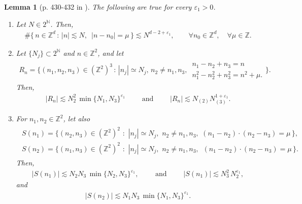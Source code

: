 \documentclass[11pt, xcolor = dvipsnames,reqno
]{amsart}
\newtheorem{lem}[thm]{Lemma}
\theoremstyle{definition}
\theoremstyle{remark}
\begin{document}
\begin{lem}[p. 430-432 in \cite{Bourgain1996}]
\label{lemma:combest-nopairings-cubic}
The following are true for every $\varepsilon_1 > 0$. 
\begin{enumerate}
    \item Let $N \in 2^{\mathbb N}$. Then,
    \begin{align}
        \# \big\{ \, n \in \mathbb Z^d \, : \, |n| \lesssim N, \,\, \,  |n - n_0| = \mu \, \big\} \lesssim N^{d-2+\varepsilon_1}, 
        \qquad \forall n_0 \in \mathbb Z^d, \quad \forall \mu \in \mathbb Z. 
    \end{align}

    \item Let $\{N_j\} \subset 2^{\mathbb{N}}$ and $n \in \mathbb{Z}^2$, and let 
    \begin{align*}
        R_n = \bigg\{ (n_1,n_2,n_3) \in (\mathbb{Z}^2)^3 \, : \,  |n_j| \simeq N_j, \, n_2 \neq n_1 , n_3, \, 
        \begin{array}{ll}
            n_1 - n_2 + n_3 = n \\
            n_1^2 - n_2^2 + n_3^2 = n^2 + \mu.
        \end{array}
        \bigg\}.
    \end{align*}
    Then, 
    \begin{align*}
        |R_n| \lesssim  N_2^2 \, \min\{N_1,N_3\}^{\varepsilon_1}
        \qquad \text{ and } \qquad  
        |R_n| \lesssim  N_{(2)}N_{(3)}^{1 + \varepsilon_1}.
    \end{align*}

    \item For $n_1, n_2 \in \mathbb Z^2$, let also
    \begin{align*}
        \begin{array}{ll}
            S(n_1) = \{ (n_2,n_3) \in (\mathbb{Z}^2)^2 \,\, : \, \, |n_j| \simeq N_j, \, \, n_2 \neq n_1, n_3, \, \,  (n_1 - n_2) \cdot (n_2 - n_3) = \mu \, \}, \\
            S(n_2) = \{ (n_1,n_3) \in (\mathbb{Z}^2)^2 \, \, : \, \, |n_j| \simeq N_j, \, \, n_2 \neq n_1, n_3, \, \, \, (n_1 - n_2) \cdot (n_2 - n_3) = \mu \, \}. 
        \end{array}
    \end{align*}
    Then,
    \begin{align}
        |S(n_1)| \lesssim N_2 N_3 \, \min\{ N_2 , N_3 \}^{\varepsilon_1}, \qquad \text{ and } \qquad 
        |S(n_1)| \lesssim N_3^2 \, N_2^{\varepsilon_1},
    \end{align}
    and 
    \begin{align}
        |S(n_2)| \lesssim N_1N_3 \, \min\{N_1 , N_3\}^{\varepsilon_1}. 
    \end{align}
    
\end{enumerate}
\end{lem}
\end{document}
